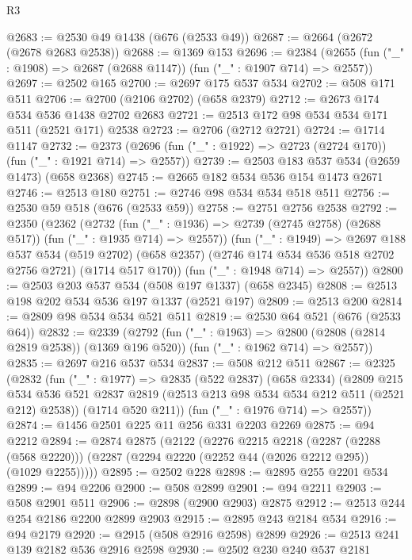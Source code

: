 \begin{lexlean}{R3}
\begin{coremodule}
@2683 := @2530 @49 @1438 (@676 (@2533 @49))
@2687 := @2664 (@2672 (@2678 @2683 @2538))
@2688 := @1369 @153
@2696 := @2384 (@2655 (fun ("_" : @1908) => @2687 (@2688 @1147)) (fun ("_" : @1907 @714) => @2557))
@2697 := @2502 @165
@2700 := @2697 @175 @537 @534
@2702 := @508 @171 @511
@2706 := @2700 (@2106 @2702) (@658 @2379)
@2712 := @2673 @174 @534 @536 @1438 @2702 @2683
@2721 := @2513 @172 @98 @534 @534 @171 @511 (@2521 @171) @2538
@2723 := @2706 (@2712 @2721)
@2724 := @1714 @1147
@2732 := @2373 (@2696 (fun ("_" : @1922) => @2723 (@2724 @170)) (fun ("_" : @1921 @714) => @2557))
@2739 := @2503 @183 @537 @534 (@2659 @1473) (@658 @2368)
@2745 := @2665 @182 @534 @536 @154 @1473 @2671
@2746 := @2513 @180
@2751 := @2746 @98 @534 @534 @518 @511
@2756 := @2530 @59 @518 (@676 (@2533 @59))
@2758 := @2751 @2756 @2538
@2792 := @2350
    (@2362
      (@2732
        (fun ("_" : @1936) => @2739 (@2745 @2758) (@2688 @517))
        (fun ("_" : @1935 @714) => @2557))
      (fun ("_" : @1949) =>
      @2697
        @188
        @537
        @534
        (@519 @2702)
        (@658 @2357)
        (@2746 @174 @534 @536 @518 @2702 @2756 @2721)
        (@1714 @517 @170))
      (fun ("_" : @1948 @714) => @2557))
@2800 := @2503 @203 @537 @534 (@508 @197 @1337) (@658 @2345)
@2808 := @2513 @198 @202 @534 @536 @197 @1337 (@2521 @197)
@2809 := @2513 @200
@2814 := @2809 @98 @534 @534 @521 @511
@2819 := @2530 @64 @521 (@676 (@2533 @64))
@2832 := @2339
    (@2792
      (fun ("_" : @1963) => @2800 (@2808 (@2814 @2819 @2538)) (@1369 @196 @520))
      (fun ("_" : @1962 @714) => @2557))
@2835 := @2697 @216 @537 @534
@2837 := @508 @212 @511
@2867 := @2325
    (@2832
      (fun ("_" : @1977) =>
      @2835
        (@522 @2837)
        (@658 @2334)
        (@2809
          @215
          @534
          @536
          @521
          @2837
          @2819
          (@2513 @213 @98 @534 @534 @212 @511 (@2521 @212) @2538))
        (@1714 @520 @211))
      (fun ("_" : @1976 @714) => @2557))
@2874 := @1456 @2501 @225 @11 @256 @331 @2203 @2269
@2875 := @94 @2212
@2894 := @2874
    @2875
    (@2122
      (@2276
        @2215
        @2218
        (@2287 (@2288 (@568 @2220)))
        (@2287 (@2294 @2220 (@2252 @44 (@2026 @2212 @295)) (@1029 @2255)))))
@2895 := @2502 @228
@2898 := @2895 @255 @2201 @534
@2899 := @94 @2206
@2900 := @508 @2899
@2901 := @94 @2211
@2903 := @508 @2901 @511
@2906 := @2898 (@2900 @2903) @2875
@2912 := @2513 @244 @254 @2186 @2200 @2899 @2903
@2915 := @2895 @243 @2184 @534
@2916 := @94 @2179
@2920 := @2915 (@508 @2916 @2598) @2899
@2926 := @2513 @241 @139 @2182 @536 @2916 @2598
@2930 := @2502 @230 @240 @537 @2181

\end{coremodule}
\end{lexlean}
